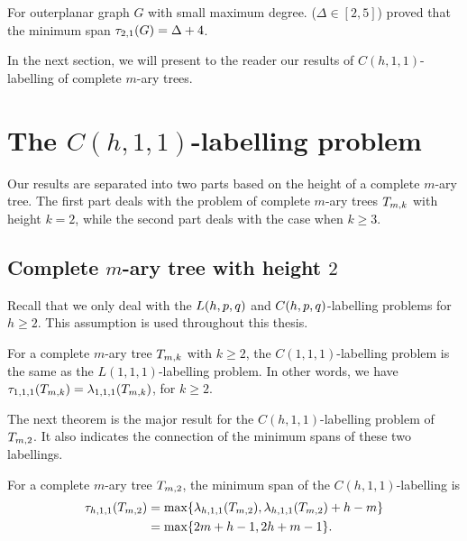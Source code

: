 For outerplanar graph $G$ with small maximum degree. ($\Delta \in [2,5]$) \cite{liu05} proved that the minimum span $\tau_{2,1}(G) = \Delta+ 4$.

In the next section, we will present to the reader our results of $C(h,1,1)$-labelling of complete $m$-ary trees. 

\section{The $C(h,1,1)$-labelling problem}
\label{sec:cyc}
Our results are separated into two parts based on the height of a complete $m$-ary tree. The first part deals with the problem of complete $m$-ary trees $T_{m,k}$ with height $k=2$, while the second part deals with the case when $k \ge 3$. 



\subsection{Complete $m$-ary tree with height $2$}
Recall that we only deal with the $L(h,p,q)$ and $C(h,p,q)$-labelling problems for $h \ge 2$. This assumption is used throughout this thesis.
\begin{remark}
For a complete $m$-ary tree $T_{m,k}$ with $k \ge 2$, the $C(1,1,1)$-labelling problem is the same as the $L(1,1,1)$-labelling problem. In other words, we have $\tau_{1,1,1}(T_{m,k}) = \lambda_{1,1,1}(T_{m,k})$, for $k \ge 2$. 
\end{remark}

The next theorem is the major result for the $C(h,1,1)$-labelling problem of $\tm2$. It also indicates the connection of the minimum spans of these two labellings. 
\begin{theorem}
\label{thm:ck2}
For a complete $m$-ary tree $\tm2$, the minimum span of the $C(h,1,1)$-labelling is  
\begin{align}
\label{ck2}
\t_{h,1,1}(\tm2) &= \max\{\lamh11(\tm2), \lamh11(\tm2)+h-m\}\\
\label{ck22}
&= \max\{2m+h-1, 2h+m-1\}.
\end{align}
\end{theorem}

